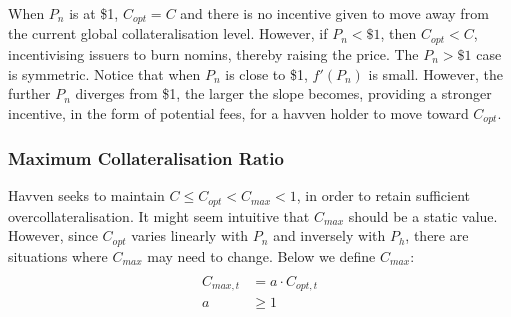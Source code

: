 \noindent When $P_n$ is at \$1, $C_{opt} = C$ and there is no incentive given to move away from the current global collateralisation level. However, if $P_n < \$1$, then $C_{opt} < C$, incentivising issuers to burn nomins, thereby raising the price. The $P_n > \$1$ case is symmetric. Notice that when $P_n$ is close to \$1, $ f'(P_n) $ is small. However, the further $P_n$ diverges from \$1, the larger the slope becomes, providing a stronger incentive, in the form of potential fees, for a havven holder to move toward $C_{opt}$. \\

\newpage

\subsubsection{Maximum Collateralisation Ratio}

\noindent Havven seeks to maintain $C \leq C_{opt} < C_{max} < 1$, in order to retain sufficient overcollateralisation. It might seem intuitive that $C_{max}$ should be a static value. However, since $C_{opt}$ varies linearly with $P_n$ and inversely with $P_h$,  there are situations where $C_{max}$ may need to change. Below we define $C_{max}$: \\

\begin{gather} \label{eq:maxcollateralisation}
\begin{align}
\begin{split}
C_{max,t} &=  a \cdot C_{opt,t} \\ 
a &\geq 1 \\
\end{split}
\end{align}
\end{gather}

\begin{center}
\end{center}

